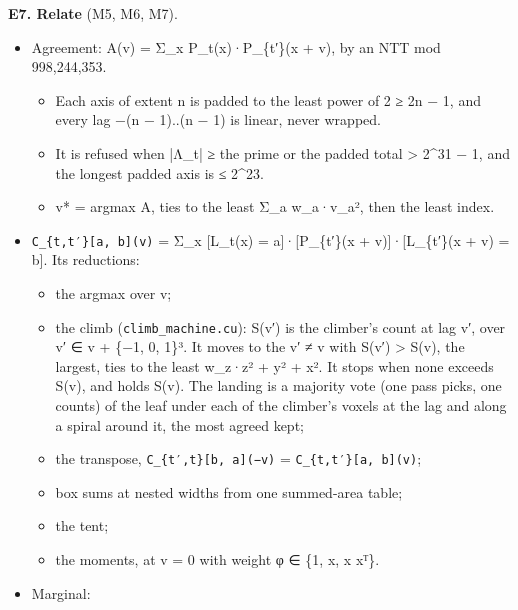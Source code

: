 \textbf{E7. Relate} (M5, M6, M7).

\begin{itemize}
\item Agreement: A(v) = Σ\_\allowbreak{}x P\_\allowbreak{}t(x)·P\_\allowbreak{}\{t′\}(x + v), by an NTT mod 998,244,353.

\begin{itemize}
\item Each axis of extent n is padded to the least power of 2 ≥ 2n − 1, and every lag −(n − 1)..(n − 1) is linear, never wrapped.
\item It is refused when |Λ\_\allowbreak{}t| ≥ the prime or the padded total > 2\textasciicircum{}31 − 1, and the longest padded axis is ≤ 2\textasciicircum{}23.
\item v* = argmax A, ties to the least Σ\_\allowbreak{}a w\_\allowbreak{}a·v\_\allowbreak{}a², then the least index.
\end{itemize}
\item \texttt{C\_\allowbreak{}\{t,t′\}[a, b](v)} = Σ\_\allowbreak{}x [L\_\allowbreak{}t(x) = a]·[P\_\allowbreak{}\{t′\}(x + v)]·[L\_\allowbreak{}\{t′\}(x + v) = b]. Its reductions:

\begin{itemize}
\item the argmax over v;
\item the climb (\texttt{climb\_\allowbreak{}machine.\allowbreak{}cu}): S(v′) is the climber's count at lag v′, over v′ ∈ v + \{−1, 0, 1\}³. It moves to the v′ ≠ v with S(v′) > S(v), the largest, ties to the least w\_\allowbreak{}z·z² + y² + x². It stops when none exceeds S(v), and holds S(v). The landing is a majority vote (one pass picks, one counts) of the leaf under each of the climber's voxels at the lag and along a spiral around it, the most agreed kept;
\item the transpose, \texttt{C\_\allowbreak{}\{t′,t\}[b, a](−v)} = \texttt{C\_\allowbreak{}\{t,t′\}[a, b](v)};
\item box sums at nested widths from one summed-area table;
\item the tent;
\item the moments, at v = 0 with weight φ ∈ \{1, x, x xᵀ\}.
\end{itemize}
\item Marginal:


\end{itemize}
